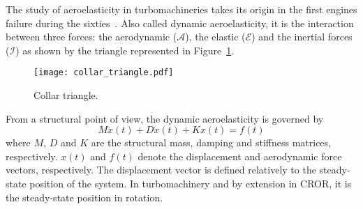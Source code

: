 
The study of aeroelasticity in turbomachineries takes its origin
in the first engines failure during the sixties~\cite{Dugundji2003}.
Also called dynamic aeroelasticity,
it is the interaction between three forces:
the aerodynamic ($\mathcal{A}$), the elastic ($\mathcal{E}$) and
the inertial forces ($\mathcal{I}$) as 
shown by the \citet{Collar1946} triangle represented in 
Figure~\ref{fig:ael_collar_triangle}. 
\begin{figure}[htp]
  \centering
  \texttt{[image: collar\_triangle.pdf]}
  \caption{Collar triangle.}
  \label{fig:ael_collar_triangle}
\end{figure}

From a structural point of view, 
the dynamic aeroelasticity is governed by
\begin{equation}
	M \ddot{x}(t) + D \dot{x}(t) + K x(t) = f(t)
	\label{eq:ael_motion_eq}
\end{equation}
where $M$, $D$ and $K$ are the structural mass, damping 
and stiffness matrices, respectively.
$x(t)$ and $f(t)$ denote the displacement 
and aerodynamic force vectors, respectively. The displacement
vector is defined relatively to the 
steady-state position of the system. In turbomachinery
and by extension in CROR, it is the steady-state position
in rotation.
